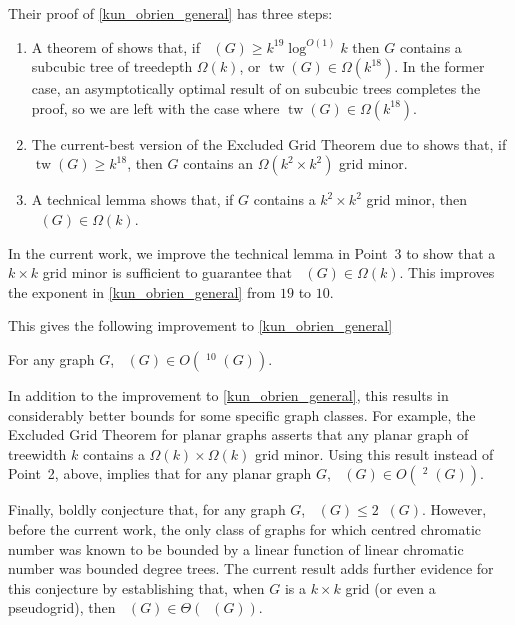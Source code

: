 \documentclass{patmorin}
\DeclareMathOperator{\tw}{tw}
\DeclareMathOperator{\chicen}{\chi_{\mathrm{cen}}}
\DeclareMathOperator{\chilin}{\chi_{\mathrm{lin}}}
\begin{document}
Their proof of \cref{kun_obrien_general} has three steps:
\begin{enumerate}
  \item A theorem of \citet{kawarabayashi.rossman:polynomial} shows that, if $\chicen(G)\ge k^{19}\log^{O(1)} k$ then $G$ contains a subcubic tree of treedepth $\Omega(k)$, or $\tw(G)\in\Omega(k^{18})$.  In the former case, an asymptotically optimal result of \citet{kun.obrien.ea:polynomial} on subcubic trees completes the proof, so we are left with the case where $\tw(G)\in\Omega(k^{18})$.
  \item The current-best version of the Excluded Grid Theorem due to \citet{chuzhoy:improved} shows that, if $\tw(G)\ge k^{18}$, then $G$ contains an $\Omega(k^2\times k^2)$ grid minor.
  \item A technical lemma \cite[Lemma~5]{kun.obrien.ea:polynomial} shows that, if $G$ contains a $k^2\times k^2$ grid minor, then $\chilin(G)\in\Omega(k)$.
\end{enumerate}

In the current work, we improve the technical lemma in Point~3 to show that a $k\times k$ grid minor is sufficient to guarantee that $\chilin(G)\in\Omega(k)$. This improves the exponent in \cref{kun_obrien_general} from $19$ to $10$.

This gives the following improvement to \cref{kun_obrien_general}
\begin{thm}\label{kun_obrien_general2}
  For any graph $G$, $\chicen(G)\in O(\chilin^{10}(G))$.
\end{thm}


In addition to the improvement to \cref{kun_obrien_general}, this results in considerably better bounds for some specific graph classes.  For example, the Excluded Grid Theorem for planar graphs asserts that any planar graph of treewidth $k$ contains a $\Omega(k)\times \Omega(k)$ grid minor.  Using this result instead of Point~2, above, implies that for any planar graph $G$, $\chicen(G)\in O(\chilin^2(G))$.

Finally, \citet{kun.obrien.ea:polynomial} boldly conjecture that, for any graph $G$, $\chicen(G)\le 2\chilin(G)$.  However, before the current work, the only class of graphs for which centred chromatic number was known to be bounded by a linear function of linear chromatic number was bounded degree trees.  The current result adds further evidence for this conjecture by establishing that, when $G$ is a $k\times k$ grid (or even a pseudogrid), then $\chicen(G)\in\Theta(\chilin(G))$.
\end{document}
